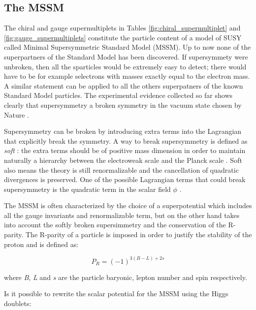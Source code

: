 \FloatBarrier

\subsection{The MSSM}

\FloatBarrier

The chiral and gauge supermultiplets in Tables \ref{fig:chiral_supermultiplet} and \ref{fig:gauge_supermultiplets} constitute the particle content of a model of SUSY called Minimal Supersymmetric Standard Model (MSSM). Up to now none of the superpartners of the Standard Model has been discovered. If supersymmety were unbroken, then all the sparticles would be extremely easy to detect; there would have to be for example selectrons with masses exactly equal to the electron mass. A similar statement can be applied to all the others superpatners of the known Standard Model particles. The experimental evidence collected so far shows clearly that supersymmetry a broken symmetry in the vacuum state chosen by Nature \cite{Martin:1997ns}.

Supersymmetry can be broken by introducing extra terms into the Lagrangian that explicitly break the symmetry. A way to break supersymmetry is defined as \textit{soft} \cite{Dimopoulos:1981zb}: the extra terms should be of positive mass dimension in order to maintain naturally a hierarchy between the electroweak scale and the Planck scale \cite{Martin:1997ns}. Soft also means the theory is still renormalizable and the cancellation of quadratic divergences is preserved. One of the possible Lagrangian terms that could break supersymmetry is the quadratic term in the scalar field $\phi$ \cite{Martin:1997ns}.

The MSSM is often characterized by the choice of a superpotential which includes all the gauge invariants and renormalizable term, but on the other hand takes into account the softly broken supersimmetry and the conservation of the R-parity. The R-parity of a particle is imposed in order to justify the stability of the proton \cite{Martin:1997ns} and is defined as:

\begin{equation}
P_{R} = (-1)^{3(B-L)+2s}
\end{equation}

where \textit{B}, \textit{L} and \textit{s} are the particle baryonic,  lepton number and spin respectively. 

Is it possible to rewrite the scalar potential for the MSSM using the Higgs doublets\cite{Martin:1997ns}:

